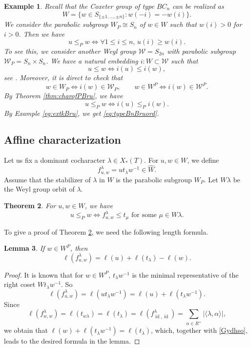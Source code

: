 \documentclass[12pt]{amsart}
\newtheorem{Th}{Theorem}[section]
\newtheorem{Lemma}[Th]{Lemma}
\newtheorem{Eg}[Th]{Example}
\def\id{\operatorname{id}}
\begin{document}
\begin{Eg}
Recall that the Coxeter group of type $BC_n$ can be realized as 
$$W=\{w\in S_{\{\pm 1,\ldots,\pm n\}}:w(-i)=-w(i)\}.$$
We consider the parabolic subgroup $W_P\cong S_n$ of $w\in W$ such that  $w(i)>0$ for $i>0$. Then we have
\begin{equation}\label{eq:typeBnBruord}
u \leq_P w\iff \forall 1\leq i\leq n,\, u(i)\geq w(i).
\end{equation}
To see this, we consider another Weyl group $\mathcal{W}=S_{2n}$ with parabolic subgroup $\mathcal{W}_{P}=S_n\times S_n$.
We have a natural embedding
$i:W\subset \mathcal{W}$ such that 
$$u\leq w\iff i(u)\leq i(w), $$
see \cite[Section 8.1]{BB}. 
Moreover, it is direct to check that
$$
w\in W_P\iff i(w)\in \mathcal{W}_{P},\qquad 
w\in W^P\iff i(w)\in \mathcal{W}^{P}.$$
By Theorem \ref{thm:charofPBru}, we have
$$u\leq_P w\iff i(u)\leq_{P} i(w).$$
By Example \ref{eg:extkBru}, we get \eqref{eq:typeBnBruord}. 
\end{Eg}


\subsection{Affine characterization}
Let us fix a dominant cocharacter $\lambda\in X_*(T)$. 
For $u,w\in W$, we define 
\begin{equation}\label{eq:fuw}
    f_{u,w}^\lambda = ut_{\lambda}w^{-1}\in \widehat{W}.
\end{equation}
Assume that the stabilizer of $\lambda$ in $W$ is the parabolic subgroup $W_P$. Let $W\lambda$ be the Weyl group orbit of $\lambda$.


 \begin{Th}\label{thm:affinecrit}
For $u,w\in W$, we have
$$u\leq_P w\iff f_{u,w}^{\lambda}\leq t_{\mu} \text{ for some $\mu\in W\lambda$}.$$
\end{Th}

To give a proof of Theorem \ref{thm:affinecrit}, we need the following  length formula.

\begin{Lemma}\label{lem:ellutw}
If $w\in W^P$, then 
$$\ell(f^{\lambda}_{u,w}) = \ell(u)+\ell(t_\lambda)-\ell(w).$$
\end{Lemma}
\begin{proof}
It is known \cite[Lemma 3.3]{LS10} that  for $w\in W^P$,   $t_\lambda w^{-1}$ is the minimal representative of the right coset $Wt_\lambda w^{-1}$.
So 
\begin{equation}\label{Gydhso}
\ell(f^\lambda_{u,w})=\ell(ut_{\lambda} w^{-1}) = \ell(u)+\ell(t_\lambda w^{-1}).   
\end{equation}
Since 
\[
  \ell(f^\lambda_{w,w})
=\ell(t_{w\lambda})=\ell(t_{\lambda}) = \ell(f^{\lambda}_{\id,\id})= \sum_{\alpha\in R^+}|\langle\lambda,\alpha\rangle|,  
\]  we obtain that
$\ell(w)+\ell(t_{\lambda} w^{-1})=\ell(t_{\lambda})$, 
which, together with \eqref{Gydhso}, leads to the desired formula in the lemma. 
\end{proof}
\end{document}
